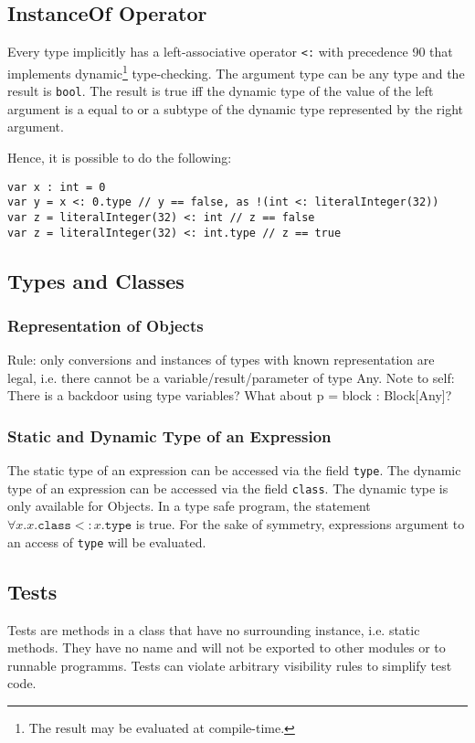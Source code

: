 \subsection{InstanceOf Operator}

Every type implicitly has a left-associative operator \texttt{<:} with precedence 90 that implements dynamic\footnote{The result may be evaluated at compile-time.} type-checking.
The argument type can be any type and the result is \texttt{bool}.
The result is true iff the dynamic type of the value of the left argument is a equal to or a subtype of the dynamic type represented by the right argument.


Hence, it is possible to do the following:
\begin{lstlisting}[language=tyr]
var x : int = 0
var y = x <: 0.type // y == false, as !(int <: literalInteger(32))
var z = literalInteger(32) <: int // z == false
var z = literalInteger(32) <: int.type // z == true
\end{lstlisting}

\subsection{Types and Classes}

\subsubsection{Representation of Objects}

Rule: only conversions and instances of types with known representation are legal, i.e. there cannot be a variable/result/parameter of type Any.
Note to self: There is a backdoor using type variables?
What about p = block : Block[Any]?

\subsubsection{Static and Dynamic Type of an Expression}

The static type of an expression can be accessed via the field \texttt{type}.
The dynamic type of an expression can be accessed via the field \texttt{class}.
The dynamic type is only available for Objects.
In a type safe program, the statement $\forall x. x\texttt{.class} <: x\texttt{.type}$ is true.
For the sake of symmetry, expressions argument to an access of \texttt{type} will be evaluated.

\subsection{Tests}

Tests are methods in a class that have no surrounding instance, i.e. static methods.
They have no name and will not be exported to other modules or to runnable programms.
Tests can violate arbitrary visibility rules to simplify test code.